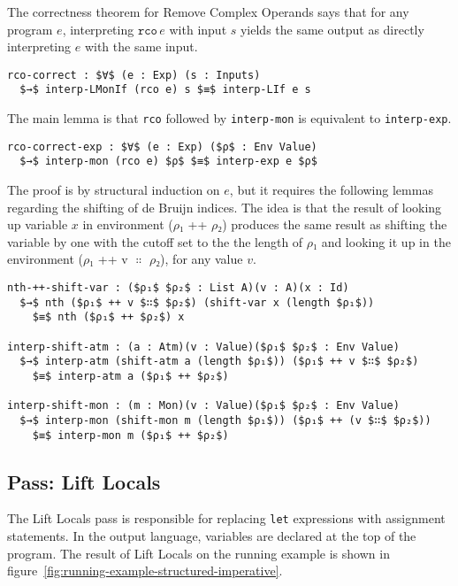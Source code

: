 \documentclass[sigplan,review,dvipsnames,screen,10pt]{acmart}
\begin{document}
The correctness theorem for Remove Complex Operands says that for any
program $e$, interpreting $\mathtt{rco}\,e$ with input $s$ yields the
same output as directly interpreting $e$ with the same input.

\begin{lstlisting}
rco-correct : $∀$ (e : Exp) (s : Inputs)
  $→$ interp-LMonIf (rco e) s $≡$ interp-LIf e s 
\end{lstlisting}

The main lemma is that \lstinline{rco} followed by
\lstinline{interp-mon} is equivalent to \lstinline{interp-exp}.

\begin{lstlisting}
rco-correct-exp : $∀$ (e : Exp) ($ρ$ : Env Value)
  $→$ interp-mon (rco e) $ρ$ $≡$ interp-exp e $ρ$
\end{lstlisting}

The proof is by structural induction on $e$, but it requires the
following lemmas regarding the shifting of de Bruijn indices.
The idea is that the result of looking up variable $x$ in
environment ($ρ₁$ ++ $ρ₂$) produces the same result as
shifting the variable by one with the cutoff set to the
the length of $ρ₁$ and looking it up in the environment
($ρ₁$ ++ v $∷$ $ρ₂$), for any value $v$.

\begin{lstlisting}[basicstyle=\ttfamily\footnotesize]
nth-++-shift-var : ($ρ₁$ $ρ₂$ : List A)(v : A)(x : Id)
  $→$ nth ($ρ₁$ ++ v $∷$ $ρ₂$) (shift-var x (length $ρ₁$))
    $≡$ nth ($ρ₁$ ++ $ρ₂$) x

interp-shift-atm : (a : Atm)(v : Value)($ρ₁$ $ρ₂$ : Env Value)
  $→$ interp-atm (shift-atm a (length $ρ₁$)) ($ρ₁$ ++ v $∷$ $ρ₂$) 
    $≡$ interp-atm a ($ρ₁$ ++ $ρ₂$) 

interp-shift-mon : (m : Mon)(v : Value)($ρ₁$ $ρ₂$ : Env Value)
  $→$ interp-mon (shift-mon m (length $ρ₁$)) ($ρ₁$ ++ (v $∷$ $ρ₂$))
    $≡$ interp-mon m ($ρ₁$ ++ $ρ₂$)
\end{lstlisting}


\subsection{Pass: Lift Locals}

The Lift Locals pass is responsible for replacing \lstinline{let}
expressions with assignment statements. In the output language,
variables are declared at the top of the program.  The result of Lift
Locals on the running example is shown in
figure~\ref{fig:running-example-structured-imperative}.
\end{document}
